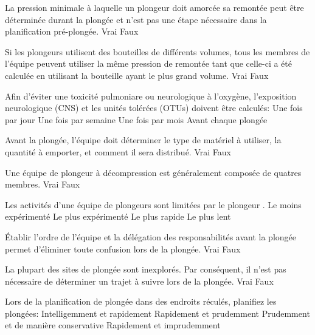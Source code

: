 \documentclass[english,12pt,a4paper]{article}
\begin{document}
\begin{outline}
		\1 La pression minimale à laquelle un plongeur doit amorcée sa remontée peut être déterminée durant la plongée et n'est pas une étape nécessaire dans la planification pré-plongée.
			\2 Vrai
			\2 Faux

		\1 Si les plongeurs utilisent des bouteilles de différents volumes, tous les membres de l'équipe peuvent utiliser la même pression de remontée tant que celle-ci a été calculée en utilisant la bouteille ayant le plus grand volume.
			\2 Vrai
			\2 Faux

		\1 Afin d'éviter une toxicité pulmoniare ou neurologique à l'oxygène, l'exposition neurologique (CNS) et les unités tolérées (OTUs) doivent être calculés:
			\2 Une fois par jour
			\2 Une fois par semaine
			\2 Une fois par mois
			\2 Avant chaque plongée

		\1 Avant la plongée, l'équipe doit déterminer le type de matériel à utiliser, la quantité à emporter, et comment il sera distribué.
			\2 Vrai
			\2 Faux

		\1 Une équipe de plongeur à décompression est généralement composée de quatres membres.
			\2 Vrai
			\2 Faux

		\1 Les activités d'une équipe de plongeurs sont limitées par le plongeur \underline{\hspace{1.5cm}}.
			\2 Le moins expérimenté
			\2 Le plus expérimenté
			\2 Le plus rapide
			\2 Le plus lent

		\1 Établir l'ordre de l'équipe et la délégation des responsabilités avant la plongée permet d'éliminer toute confusion lors de la plongée.
			\2 Vrai
			\2 Faux

		\1 La plupart des sites de plongée sont inexplorés. Par conséquent, il n'est pas nécessaire de déterminer un trajet à suivre lors de la plongée.
			\2 Vrai
			\2 Faux

		\1 Lors de la planification de plongée dans des endroits réculés, planifiez les plongées:
			\2 Intelligemment et rapidement
			\2 Rapidement et prudemment
			\2 Prudemment et de manière conservative
			\2 Rapidement et imprudemment
	\end{outline}
	\pagebreak

\end{document}
